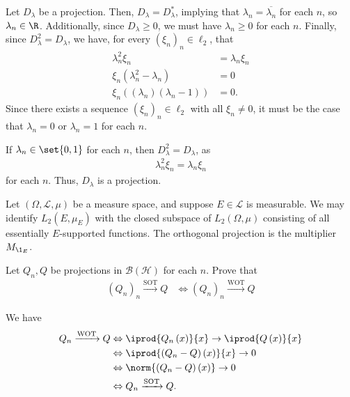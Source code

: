 \documentclass[10pt]{mypackage}
\begin{document}
\begin{solution}
  Let $D_{\lambda}$ be a projection. Then, $D_{\lambda} = D_{\lambda}^{\ast}$, implying that $\lambda_n = \overline{\lambda_n}$ for each $n$, so $\lambda_n \in \R$. Additionally, since $D_{\lambda} \geq 0$, we must have $\lambda_n \geq 0$ for each $n$. Finally, since $D_{\lambda}^2 = D_{\lambda}$, we have, for every $\left(\xi_n\right)_{n}\in \ell_2$, that
  \begin{align*}
    \lambda_n^2\xi_n &= \lambda_n\xi_n\\
    \xi_n\left(\lambda_n^2 - \lambda_n\right) &= 0\\
    \xi_n\left(\left(\lambda_n\right)\left(\lambda_n - 1\right)\right) &= 0.
  \end{align*}
  Since there exists a sequence $\left(\xi_n\right)_n\in \ell_2$ with all $\xi_n\neq 0$, it must be the case that $\lambda_n = 0$ or $\lambda_n = 1$ for each $n$.\newline

  If $\lambda_n \in\set{0,1}$ for each $n$, then $D_{\lambda}^2 = D_{\lambda}$, as
  \begin{align*}
    \lambda_n^2\xi_n = \lambda_n\xi_n
  \end{align*}
  for each $n$. Thus, $D_{\lambda}$ is a projection.
\end{solution}
\begin{example}
  Let $\left(\Omega,\mathcal{L},\mu\right)$ be a measure space, and suppose $E\in \mathcal{L}$ is measurable. We may identify $L_2\left(E,\mu_E\right)$ with the closed subspace of $L_2\left(\Omega,\mu\right)$ consisting of all essentially $E$-supported functions. The orthogonal projection is the multiplier $M_{\1_{E}}$.
\end{example}
\begin{exercise}
  Let $Q_n,Q$ be projections in $\mathcal{B}\left(\mathcal{H}\right)$ for each $n$. Prove that
  \begin{align*}
    \left(Q_n\right)_n\xrightarrow{\text{SOT}}Q &\Leftrightarrow \left(Q_n\right)_n\xrightarrow{\text{WOT}}Q
  \end{align*}
\end{exercise}
\begin{solution}
  We have
  \begin{align*}
    Q_n\xrightarrow{\text{WOT}}Q &\Leftrightarrow \iprod{Q_n\left(x\right)}{x} \rightarrow \iprod{Q\left(x\right)}{x}\\
                                 &\Leftrightarrow \iprod{\left(Q_n - Q\right)\left(x\right)}{x}\rightarrow 0\\
                                 &\Leftrightarrow \norm{\left(Q_n - Q\right)\left(x\right)}\rightarrow 0\\
                                 &\Leftrightarrow Q_n\xrightarrow{\text{SOT}}Q.
  \end{align*}
\end{solution}
\end{document}
